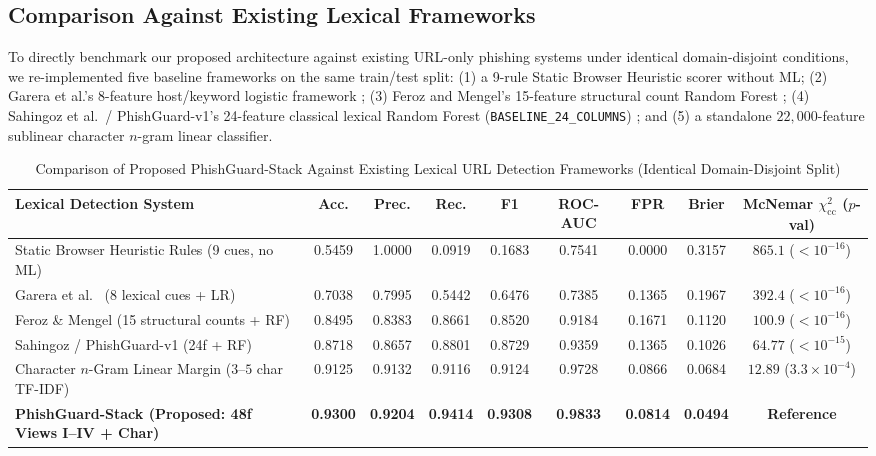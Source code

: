 \documentclass[conference]{IEEEtran}
\begin{document}
\subsection{Comparison Against Existing Lexical Frameworks}
To directly benchmark our proposed architecture against existing URL-only phishing systems under identical domain-disjoint conditions, we re-implemented five baseline frameworks on the same train/test split: (1) a 9-rule Static Browser Heuristic scorer without ML; (2) Garera et al.'s 8-feature host/keyword logistic framework \cite{garera2007}; (3) Feroz and Mengel's 15-feature structural count Random Forest \cite{feroz2015}; (4) Sahingoz et al.\ / PhishGuard-v1's 24-feature classical lexical Random Forest (\texttt{BASELINE\_24\_COLUMNS}) \cite{sahingoz2019}; and (5) a standalone $22{,}000$-feature sublinear character $n$-gram linear classifier.

\begin{table}[t]
\caption{Comparison of Proposed PhishGuard-Stack Against Existing Lexical URL Detection Frameworks (Identical Domain-Disjoint Split)}
\label{tab:baselines}
\centering
\footnotesize
\renewcommand{\arraystretch}{1.14}
\begin{tabular}{p{5.1cm}cccccccc}
\toprule
\textbf{Lexical Detection System} & \textbf{Acc.} & \textbf{Prec.} & \textbf{Rec.} & \textbf{F1} & \textbf{ROC-AUC} & \textbf{FPR} & \textbf{Brier} & \textbf{McNemar $\chi^2_{\text{cc}}$ ($p$-val)} \\
\midrule
Static Browser Heuristic Rules (9 cues, no ML) & 0.5459 & 1.0000 & 0.0919 & 0.1683 & 0.7541 & 0.0000 & 0.3157 & $865.1$ ($<10^{-16}$) \\
Garera et al.\ \cite{garera2007} (8 lexical cues + LR) & 0.7038 & 0.7995 & 0.5442 & 0.6476 & 0.7385 & 0.1365 & 0.1967 & $392.4$ ($<10^{-16}$) \\
Feroz \& Mengel \cite{feroz2015} (15 structural counts + RF) & 0.8495 & 0.8383 & 0.8661 & 0.8520 & 0.9184 & 0.1671 & 0.1120 & $100.9$ ($<10^{-16}$) \\
Sahingoz / PhishGuard-v1 \cite{sahingoz2019} (24f + RF) & 0.8718 & 0.8657 & 0.8801 & 0.8729 & 0.9359 & 0.1365 & 0.1026 & $64.77$ ($<10^{-15}$) \\
Character $n$-Gram Linear Margin ($3$--$5$ char TF-IDF) & 0.9125 & 0.9132 & 0.9116 & 0.9124 & 0.9728 & 0.0866 & 0.0684 & $12.89$ ($3.3\times 10^{-4}$) \\
\midrule
\textbf{PhishGuard-Stack (Proposed: 48f Views I--IV + Char)} & \textbf{0.9300} & \textbf{0.9204} & \textbf{0.9414} & \textbf{0.9308} & \textbf{0.9833} & \textbf{0.0814} & \textbf{0.0494} & \textbf{Reference} \\
\bottomrule
\end{tabular}
\end{table}
\end{document}
